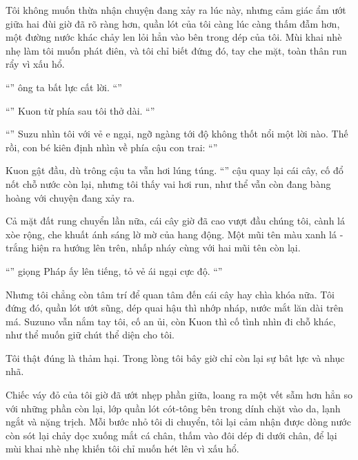 \documentclass[../main.tex]{subfiles}
\begin{document}
Tôi không muốn thừa nhận chuyện đang xảy ra lúc này, nhưng cảm giác ẩm ướt giữa hai đùi giờ đã rõ ràng hơn, quần lót của tôi càng lúc càng thấm đẫm hơn, một đường nước khác chảy len lỏi hẳn vào bên trong dép của tôi. Mùi khai nhè nhẹ làm tôi muốn phát điên, và tôi chỉ biết đứng đó, tay che mặt, toàn thân run rẩy vì xấu hổ.

``'' ông ta bất lực cất lời. ``''

``'' Kuon từ phía sau tôi thở dài. ``''

``'' Suzu nhìn tôi với vẻ e ngại, ngỡ ngàng tới độ không thốt nổi một lời nào. Thế rồi, con bé kiên định nhìn về phía cậu con trai: ``''

Kuon gật đầu, dù trông cậu ta vẫn hơi lúng túng. ``'' cậu quay lại cái cây, cố đổ nốt chỗ nước còn lại, nhưng tôi thấy vai hơi run, như thể vẫn còn đang bàng hoàng với chuyện đang xảy ra.

Cả mặt đất rung chuyển lần nữa, cái cây giờ đã cao vượt đầu chúng tôi, cành lá xòe rộng, che khuất ánh sáng lờ mờ của hang động. Một mũi tên màu xanh lá - trắng hiện ra hướng lên trên, nhấp nháy cùng với hai mũi tên còn lại.


``'' giọng Pháp ấy lên tiếng, tỏ vẻ ái ngại cực độ. ``''

Nhưng tôi chẳng còn tâm trí để quan tâm đến cái cây hay chìa khóa nữa. Tôi đứng đó, quần lót ướt sũng, dép quai hậu thì nhớp nháp, nước mắt lăn dài trên má. Suzuno vẫn nắm tay tôi, cố an ủi, còn Kuon thì cố tình nhìn đi chỗ khác, như thể muốn giữ chút thể diện cho tôi.

Tôi thật đúng là thảm hại. Trong lòng tôi bây giờ chỉ còn lại sự bât lực và nhục nhã.

Chiếc váy đỏ của tôi giờ đã ướt nhẹp phần giữa, loang ra một vết sẫm hơn hẳn so với những phần còn lại, lớp quần lót cót-tông bên trong dính chặt vào da, lạnh ngắt và nặng trịch. Mỗi bước nhỏ tôi di chuyển, tôi lại cảm nhận được dòng nước còn sót lại chảy dọc xuống mắt cá chân, thấm vào đôi dép đi dưới chân, để lại mùi khai nhè nhẹ khiến tôi chỉ muốn hét lên vì xấu hổ.
\end{document}
